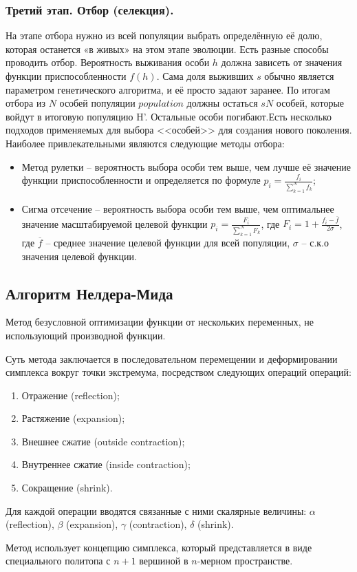 \subsubsection{Третий этап. Отбор (селекция).}
\noindent\indent На этапе отбора нужно из всей популяции выбрать определённую её
долю, которая останется «в живых» на этом этапе эволюции. Есть разные способы
проводить отбор. Вероятность выживания особи $h$ должна зависеть от значения функции
приспособленности $f(h)$. Сама доля выживших $s$ обычно является параметром
генетического алгоритма, и её просто задают заранее. По итогам отбора из $N$ особей
популяции $population$ должны остаться $sN$ особей, которые войдут в итоговую популяцию H'.
Остальные особи погибают.Есть несколько подходов применяемых для выбора <<особей>>
для создания нового поколения. Наиболее привлекательными являются следующие методы
отбора:
  \begin{itemize}
    \item Метод рулетки -- вероятность выбора особи тем выше, чем лучше её значение
функции приспособленности и определяется по формуле $p_i = \frac{f_i}{\sum\limits_{k=1}^{N}f_k}$;
    \item Сигма отсечение -- вероятность выбора особи тем выше, чем оптимальнее
значение масштабируемой целевой функции $p_i = \frac{F_i}{\sum\limits_{k=1}^{N}F_k}$,
где $F_i = 1 + \frac{f_i - \overline{f}}{2\sigma}$, где $\overline{f}$ -- среднее
значение целевой функции для всей популяции, $\sigma$ -- с.к.о значения целевой функции.
  \end{itemize}
\subsection{Алгоритм Нелдера-Мида}
\noindent\indent Метод безусловной оптимизации функции от нескольких переменных,
не использующий производной функции.\par
  Суть метода заключается в последовательном перемещении и деформировании симплекса
вокруг точки экстремума, посредством следующих операций операций:\par
\begin{enumerate}
  \item Отражение (reflection);
  \item Растяжение (expansion);
  \item Внешнее сжатие (outside contraction);
  \item Внутреннее сжатие (inside contraction);
  \item Сокращение (shrink).
\end{enumerate}
Для каждой операции вводятся связанные с ними скалярные величины: $\alpha$ (reflection),
$\beta$ (expansion), $\gamma$ (contraction), $\delta$ (shrink).\par
  Метод использует концепцию симплекса, который представляется в виде специального
политопа с $n+1$ вершиной в $n$-мерном пространстве.\par
